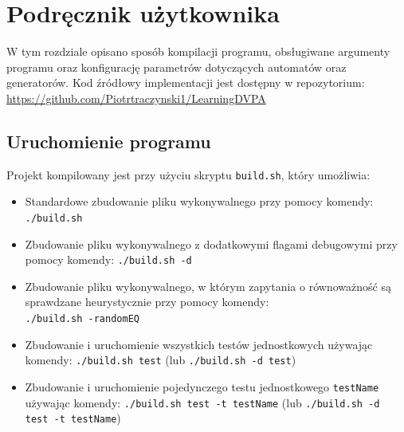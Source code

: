\chapter{Podręcznik użytkownika}

W tym rozdziale opisano sposób kompilacji programu, obsługiwane argumenty programu oraz konfigurację
parametrów dotyczących automatów oraz generatorów. Kod źródłowy implementacji jest dostępny w repozytorium:
\url{https://github.com/Piotrtraczynski1/LearningDVPA}

\section{Uruchomienie programu}

Projekt kompilowany jest przy użyciu skryptu \texttt{build.sh}, który umożliwia:

\begin{itemize}
    \item Standardowe zbudowanie pliku wykonywalnego  przy pomocy komendy: \texttt{./build.sh}
    \item Zbudowanie pliku wykonywalnego  z dodatkowymi flagami debugowymi przy pomocy komendy: \texttt{./build.sh -d}
    \item Zbudowanie pliku wykonywalnego, w którym zapytania o równoważność są sprawdzane heurystycznie  przy pomocy komendy: \\ \texttt{./build.sh -randomEQ}
    \item Zbudowanie i uruchomienie wszystkich testów jednostkowych używając komendy: \texttt{./build.sh test} (lub \texttt{./build.sh -d test})
    \item Zbudowanie i uruchomienie pojedynczego testu jednostkowego \texttt{testName} używając komendy: \texttt{./build.sh test -t testName} (lub \texttt{./build.sh -d test -t testName})
\end{itemize}

